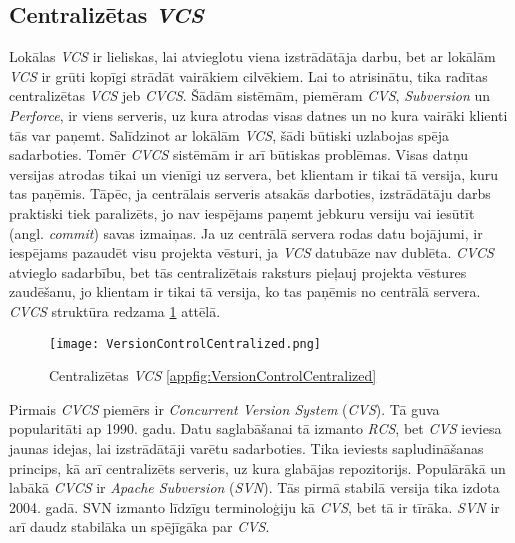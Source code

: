 \subsection{Centralizētas \textit{VCS}}
Lokālas \textit{VCS} ir lieliskas, lai atvieglotu viena izstrādātāja darbu, bet ar lokālām \textit{VCS} ir grūti kopīgi strādāt vairākiem cilvēkiem. Lai to atrisinātu, tika radītas centralizētas \textit{VCS} jeb \textit{CVCS}. Šādām sistēmām, piemēram \textit{CVS}, \textit{Subversion} un \textit{Perforce}, ir viens serveris, uz kura atrodas visas datnes un no kura vairāki klienti tās var paņemt. Salīdzinot ar lokālām \textit{VCS}, šādi būtiski uzlabojas spēja sadarboties. Tomēr \textit{CVCS} sistēmām ir arī būtiskas problēmas. Visas datņu versijas atrodas tikai un vienīgi uz servera, bet klientam ir tikai tā versija, kuru tas paņēmis. Tāpēc, ja centrālais serveris atsakās darboties, izstrādātāju darbs praktiski tiek paralizēts, jo nav iespējams paņemt jebkuru versiju vai iesūtīt (angl. \textit{commit}) savas izmaiņas. Ja uz centrālā servera rodas datu bojājumi, ir iespējams pazaudēt visu projekta vēsturi, ja \textit{VCS} datubāze nav dublēta.
\textit{CVCS} atvieglo sadarbību, bet tās centralizētais raksturs pieļauj projekta vēstures zaudēšanu, jo klientam ir tikai tā versija, ko tas paņēmis no centrālā servera. \textit{CVCS} struktūra redzama \ref{fig:VersionControlCentralized} attēlā. \cite[CVCS]{chacon2014progit}
\begin{figure}[H]%
	\centering
	\captionsetup{justification=centering}
	\texttt{[image: VersionControlCentralized.png]}
	\caption{Centralizētas \textit{VCS} \ref{appfig:VersionControlCentralized}}
	\label{fig:VersionControlCentralized}
\end{figure}
Pirmais \textit{CVCS} piemērs ir \textit{Concurrent Version System} (\textit{CVS}). Tā guva popularitāti ap 1990. gadu. Datu saglabāšanai tā izmanto \textit{RCS}, bet \textit{CVS} ieviesa jaunas idejas, lai izstrādātāji varētu sadarboties. Tika ieviests sapludināšanas princips, kā arī centralizēts serveris, uz kura glabājas repozitorijs.
Populārākā un labākā \textit{CVCS} ir \textit{Apache Subversion} (\textit{SVN}). Tās pirmā stabilā versija tika izdota 2004. gadā. SVN izmanto līdzīgu terminoloģiju kā \textit{CVS}, bet tā ir tīrāka. \textit{SVN} ir arī daudz stabilāka un spējīgāka par \textit{CVS}.
\cite[SVN]{raymondVCS}

